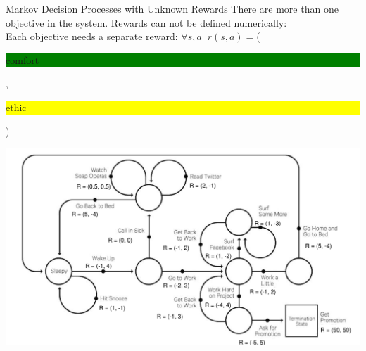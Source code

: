 \documentclass{beamer}
\newcommand{\atten}[1]{{\color{green}{#1}}}
\newcommand\Fontvi{\fontsize{9}{10.2}\selectfont}
\begin{document}

\begin{frame}{Markov Decision Processes with Unknown Rewards}
\Fontvi
There are more than one objective in the system. Rewards can not be defined numerically: ~\\
Each objective needs a separate reward: $\forall s,a \;\; r(s, a)=$({\colorbox{green}{\strut comfort} , \colorbox{yellow}{\strut ethic}})
\begin{center}
\includegraphics[scale=0.35]{figures-new/mdp-example-cool-2} ~\\
\end{center}

%
%

\end{frame}
\end{document}
